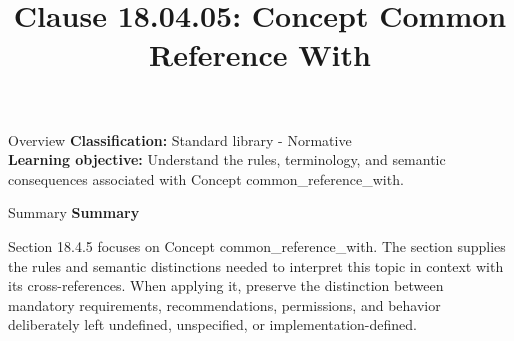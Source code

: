 \documentclass[10pt,letterpaper]{article}
\title{Clause 18.04.05: Concept Common Reference With}
\author{}
\date{}
\begin{document}
\maketitle
\begin{CornellOverviewBox}{Overview}
\textbf{Classification:} Standard library - Normative\\[2pt]
\textbf{Learning objective:} Understand the rules, terminology, and semantic consequences associated with Concept common\_reference\_with.
\end{CornellOverviewBox}\begin{CornellSummaryBox}{Summary}
{\sffamily\bfseries\color{Accent} Summary}\par\vspace{3pt}Section 18.4.5 focuses on Concept common\_reference\_with. The section supplies the rules and semantic distinctions needed to interpret this topic in context with its cross-references. When applying it, preserve the distinction between mandatory requirements, recommendations, permissions, and behavior deliberately left undefined, unspecified, or implementation-defined.
\end{CornellSummaryBox}
\end{document}
